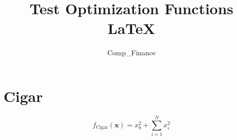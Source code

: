 \documentclass{article}
\begin{document}
\title{Test Optimization Functions \LaTeX{}}
\author{Comp_Finance}

\section{Cigar}

\begin{equation}
    f_{\textrm{Cigar}}(\textbf{x}) = x_0^2 + \sum_{i=1}^N x^2_i
\end{equation}
\end{document}
